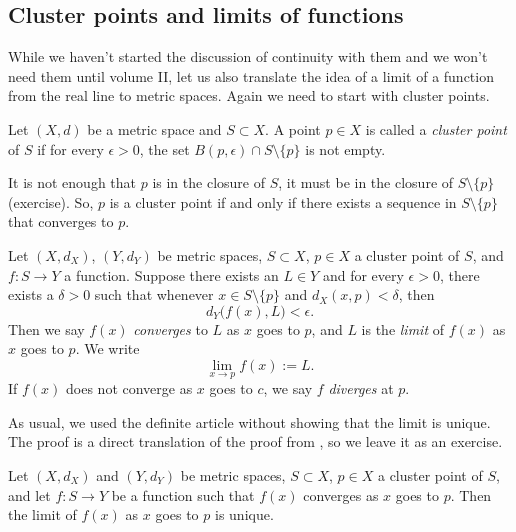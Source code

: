 \subsection{Cluster points and limits of functions}

While we haven't started the discussion of continuity with them and we won't
need them until volume II, let us also
translate the idea of a limit of a function from the real line to metric
spaces.
Again we need to start with cluster points.

\begin{defn}
Let $(X,d)$ be a metric space and
$S \subset X$. A point $p \in X$ is called
a \emph{cluster point} of $S$
if for every $\epsilon > 0$, the set $B(p,\epsilon) \cap S
\setminus \{ p \}$ is not empty.
\end{defn}

It is not enough that $p$ is in the closure of $S$,
it must be in the closure of
$S \setminus \{ p \}$ (exercise).
So, $p$ is a cluster point if and only if there exists a sequence in $S \setminus
\{ p \}$ that converges to $p$.

\begin{defn}
%
Let $(X,d_X)$, $(Y,d_Y)$ be metric spaces, $S \subset X$, $p \in X$ a cluster point of $S$,
and $f \colon S \to Y$ a function.
Suppose there exists an $L \in Y$ and for every $\epsilon > 0$,
there exists a $\delta > 0$ such that whenever $x \in S \setminus \{ p \}$
and $d_X(x,p) < \delta$, then
\begin{equation*}
d_Y\bigl(f(x),L\bigr) < \epsilon .
\end{equation*}
Then we say $f(x)$
\emph{converges} to $L$ as $x$ goes
to $p$, and $L$ is the \emph{limit} of $f(x)$ as $x$
goes to $p$.  We write
\begin{equation*}
\lim_{x \to p} f(x) := L .
\end{equation*}
If $f(x)$ does not converge as $x$ goes to $c$, we say $f$
\emph{diverges} at $p$.
\end{defn}

As usual, we used the definite article without showing that the
limit is unique.  The proof is a direct translation of the proof
from , so we leave it as an exercise.

\begin{prop} \label{prop:mslimitisunique}
Let $(X,d_X)$ and $(Y,d_Y)$ be metric spaces, $S \subset X$, $p \in X$
a cluster point of $S$, and let $f \colon S \to Y$ be a function
such that $f(x)$ converges as $x$ goes to $p$.  Then
the limit of $f(x)$ as $x$ goes to $p$ is unique.
\end{prop}

